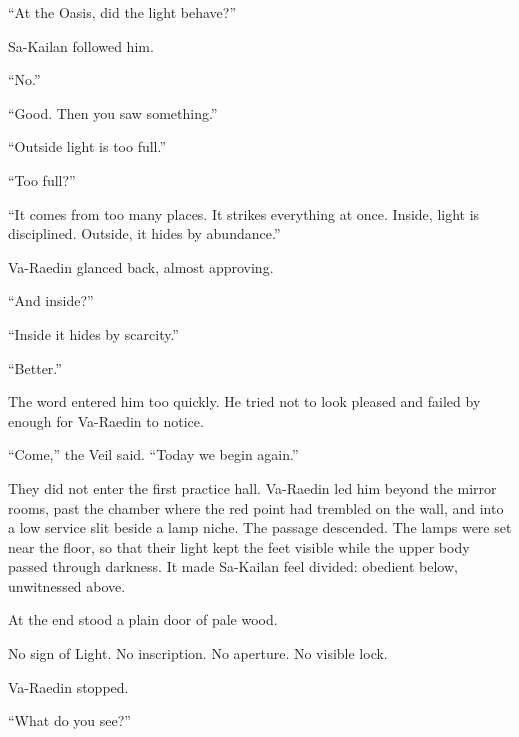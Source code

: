 “At the Oasis, did the light behave?”\par

Sa-Kailan followed him.\par

“No.”\par

“Good.
Then you saw something.”\par

“Outside light is too full.”\par

“Too full?”\par

“It comes from too many places.
It strikes everything at once.
Inside, light is disciplined.
Outside, it hides by abundance.”\par

Va-Raedin glanced back, almost approving.\par

“And inside?”\par

“Inside it hides by scarcity.”\par

“Better.”\par

The word entered him too quickly.
He tried not to look pleased and failed by enough for Va-Raedin to notice.\par

“Come,” the Veil said.
“Today we begin again.”\par

They did not enter the first practice hall.
Va-Raedin led him beyond the mirror rooms, past the chamber where the red point had trembled on the wall, and into a low service slit beside a lamp niche.
The passage descended.
The lamps were set near the floor, so that their light kept the feet visible while the upper body passed through darkness.
It made Sa-Kailan feel divided: obedient below, unwitnessed above.\par

At the end stood a plain door of pale wood.\par

No sign of Light.
No inscription.
No aperture.
No visible lock.\par

Va-Raedin stopped.\par

“What do you see?”\par

